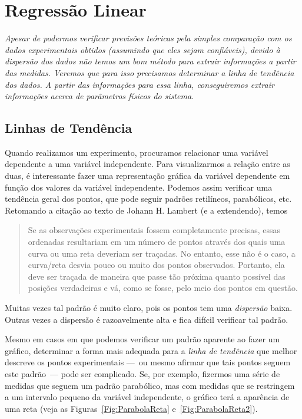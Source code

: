 \chapter{Regressão Linear}
\label{Chap:RegressoLinear}

\begin{fullwidth}
{\it
Apesar de podermos verificar previsões teóricas pela simples comparação com os dados experimentais obtidos (assumindo que eles sejam confiáveis), devido à dispersão dos dados não temos um bom método para extrair informações a partir das medidas. Veremos que para isso precisamos determinar a linha de tendência dos dados. A partir das informações para essa linha, conseguiremos extrair informações acerca de parâmetros físicos do sistema.
}
\end{fullwidth}

\section{Linhas de Tendência}

Quando realizamos um experimento, procuramos relacionar uma variável dependente a uma variável independente. Para visualizarmos a relação entre as duas, é interessante fazer uma representação gráfica da variável dependente em função dos valores da variável independente. Podemos assim verificar uma tendência geral dos pontos, que pode seguir padrões retilíneos, parabólicos, etc. Retomando a citação ao texto de Johann H. Lambert (e a extendendo), temos\cite{Lambert}
\begin{quote}
Se as observações experimentais fossem completamente precisas, essas ordenadas resultariam em um número de pontos através dos quais uma curva ou uma reta deveriam ser traçadas. No entanto, esse não é o caso, a curva/reta desvia pouco ou muito dos pontos observados. Portanto, ela deve ser traçada de maneira que passe tão próxima quanto possível das posições verdadeiras e vá, como se fosse, pelo meio dos pontos em questão.
\end{quote}
%
Muitas vezes tal padrão é muito claro, pois os pontos tem uma \emph{dispersão} baixa. Outras vezes a dispersão é razoavelmente alta e fica difícil verificar tal padrão.

Mesmo em casos em que podemos verificar um padrão aparente ao fazer um gráfico, determinar a forma mais adequada para a \emph{linha de tendência} que melhor descreve os pontos experimentais ---~ou mesmo afirmar que tais pontos seguem este padrão~--- pode ser complicado. Se, por exemplo, fizermos uma série de medidas que seguem um padrão parabólico, mas com medidas que se restringem a um intervalo pequeno da variável independente, o gráfico terá a aparência de uma reta (veja as Figuras~\ref{Fig:ParabolaReta} e~\ref{Fig:ParabolaReta2}).
\begin{figure*}
\centering
\forceversofloat
\caption{Gráfico de um conjunto de pontos que aparentemente seguem uma tendência linear. Veja também a Figura~\ref{Fig:ParabolaReta2}.}
\label{Fig:ParabolaReta}

\end{figure*}

